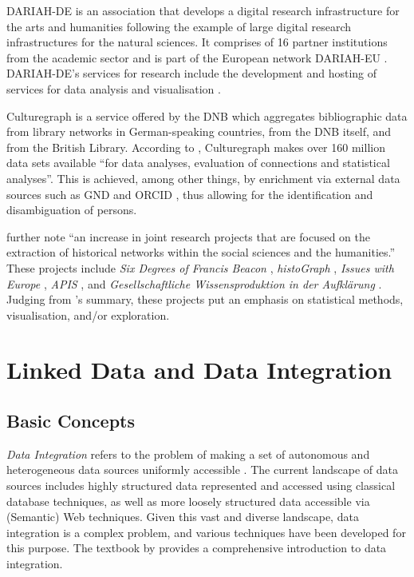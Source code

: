DARIAH-DE \autocite{DariahDE} is an association that develops
a digital research infrastructure for the arts and humanities
following the example of large digital research infrastructures for the natural sciences.
It comprises of 16 partner institutions from the academic sector
and is part of the European network DARIAH-EU \autocite{DariahEU}.
DARIAH-DE's services for research include
the development and hosting of services for data analysis and visualisation
\autocite{WikiDariahDE}.

Culturegraph \autocite{Vorndran2018,Culturegraph} is a service offered by the
\gls{DNB} which aggregates bibliographic data 
from library networks in German-speaking countries,
from the \gls{DNB} itself, and from the British Library.
According to \textcite{Vorndran2018}, Culturegraph makes over 160 million data sets
available \enquote{for data analyses, evaluation of connections and statistical analyses}.
This is achieved, among other things,
by enrichment via external data sources such as \gls{GND}
and ORCID \autocite{ORCID}, thus allowing for the identification
and disambiguation of persons.

\textcite{Menzel2020} further note \enquote{an increase in joint research projects
that are focused on the extraction of historical networks within the social sciences and the humanities.}
These projects include \emph{Six Degrees of Francis Beacon} \autocite{Warren2016,SixDegreesFB},
\emph{histoGraph} \autocite{Novak2014,histograph},
\emph{Issues with Europe} \autocite{IssuesWithEurope},
\emph{APIS} \autocite{Gruber2017,APIS},
and \emph{Gesellschaftliche Wissensproduktion in der Aufklärung} \autocite{Purschwitz2018}.
Judging from \citeauthor*{Menzel2020}'s \autocite*{Menzel2020} summary,
these projects put an emphasis on statistical methods,
visualisation, and/or exploration.

\section{Linked Data and Data Integration}
\label{sec:linked_data+integration}

\subsection{Basic Concepts}
\label{subsec:LOD_basic_concepts}

\emph{Data Integration} refers to the problem of making a set of autonomous and heterogeneous data sources
uniformly accessible \autocite[p.6]{Doan2012}.
The current landscape of data sources includes highly structured data
represented and accessed using classical database techniques,
as well as more loosely structured data accessible via (Semantic) Web techniques.
Given this vast and diverse landscape, data integration is a complex problem,
and various techniques have been developed for this purpose.
The textbook by \textcite{Doan2012} provides a
comprehensive introduction to data integration.

